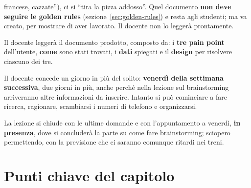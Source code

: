 \begin{description}
        francese, cazzate''), ci si ``tira la pizza addosso''. Quel documento
        \textbf{non deve seguire le golden rules}
        (sezione~\ref{sec:golden-rules}) e resta agli studenti; ma va creato,
        per mostrare di aver lavorato. Il docente non lo leggerà
        prontamente.
  \item[Il documento consegnato] Il docente leggerà il documento prodotto,
        composto da: i \textbf{tre pain point} dell'utente, \textbf{come}
        sono stati trovati, i \textbf{dati} spiegati e il \textbf{design} per
        risolvere ciascuno dei tre.
  \item[Scadenza] Il docente concede un giorno in più del solito:
        \textbf{venerdì della settimana successiva}, due giorni in più, anche
        perché nella lezione sul brainstorming arriveranno altre informazioni
        da inserire. Intanto si può cominciare a fare ricerca, ragionare,
        scambiarsi i numeri di telefono e organizzarsi.
\end{description}

La lezione si chiude con le ultime domande e con l'appuntamento a venerdì,
\textbf{in presenza}, dove si concluderà la parte su come fare brainstorming;
sciopero permettendo, con la previsione che ci saranno comunque ritardi nei
treni.

\section*{Punti chiave del capitolo}

